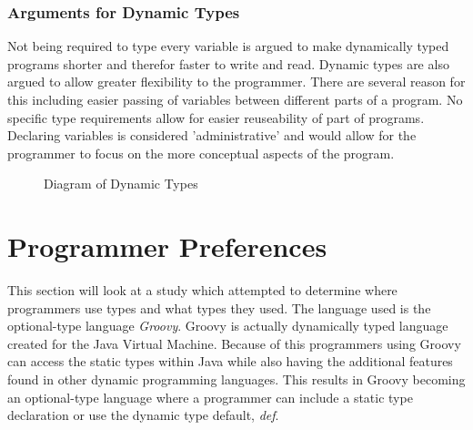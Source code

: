 \documentclass{sig-alternate}
\begin{document}
\subsubsection{Arguments for Dynamic Types}
Not being required to type every variable is argued to make dynamically typed programs shorter and therefor faster to write and read. Dynamic types are also argued to allow greater flexibility to the programmer. There are several reason for this including easier passing of variables between different parts of a program. No specific type requirements allow for easier reuseability of part of programs. Declaring variables is considered 'administrative' and would allow for the programmer to focus on the more conceptual aspects of the program.

\begin{figure}
\centering
{}
\caption{Diagram of Dynamic Types \cite{Ferg2012}}
\end{figure}

\section{Programmer Preferences} \label{programmers}
This section will look at a study which attempted to determine where programmers use types and what types they used. The language used is the optional-type language \emph{Groovy}. Groovy is actually dynamically typed language created for the Java Virtual Machine. Because of this programmers using Groovy can access the static types within Java while also having the additional features found in other dynamic programming languages. This results in Groovy becoming an optional-type language where a programmer can include a static type declaration or use the dynamic type default, \emph{def}.
\end{document}
